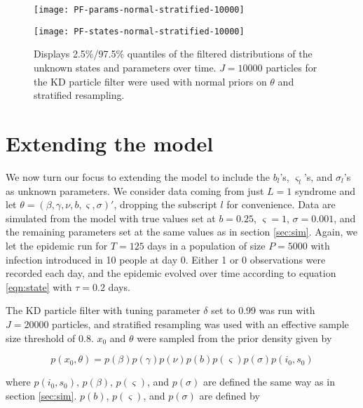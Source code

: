 \documentclass{elsarticle}
\begin{document}
\begin{figure}[ht]
\centering
\begin{minipage}{1.0\linewidth}
\texttt{[image: PF-params-normal-stratified-10000]}
\end{minipage}
\begin{minipage}{1.0\linewidth}
\texttt{[image: PF-states-normal-stratified-10000]}
\end{minipage}
\caption{Displays 2.5\%/97.5\% quantiles of the filtered distributions of the unknown states and parameters over time.  $J = 10000$ particles for the KD particle filter were used with normal priors on $\theta$ and stratified resampling.} \label{fig:strat}
\end{figure}

\section{Extending the model \label{sec:extend}}

We now turn our focus to extending the model to include the $b_l$'s, $\varsigma_l$'s, and $\sigma_l$'s as unknown parameters.  We consider data coming from just $L = 1$ syndrome and let $\theta = (\beta, \gamma, \nu, b, \varsigma, \sigma)'$, dropping the subscript $l$ for convenience.  Data are simulated from the model with true values set at $b = 0.25$, $\varsigma = 1$, $\sigma = 0.001$, and the remaining parameters set at the same values as in section \ref{sec:sim}.  Again, we let the epidemic run for $T = 125$ days in a population of size $P = 5000$ with infection introduced in 10 people at day 0.  Either 1 or 0 observations were recorded each day, and the epidemic evolved over time according to equation \eqref{eqn:state} with $\tau = 0.2$ days.

The KD particle filter with tuning parameter $\delta$ set to 0.99 was run with $J = 20000$ particles, and stratified resampling was used with an effective sample size threshold of 0.8.  $x_0$ and $\theta$ were sampled from the prior density given by

\[p\left(x_0,\theta\right) = p\left(\beta\right)p\left(\gamma\right)p\left(\nu\right)p\left(b\right)p\left(\varsigma\right)p\left(\sigma\right)p\left(i_0,s_0\right)\]

\noindent where $p(i_0,s_0)$, $p(\beta)$, $p(\varsigma)$, and $p(\sigma)$ are defined the same way as in section \ref{sec:sim}.  $p(b)$, $p(\varsigma)$, and $p(\sigma)$ are defined by
\end{document}

